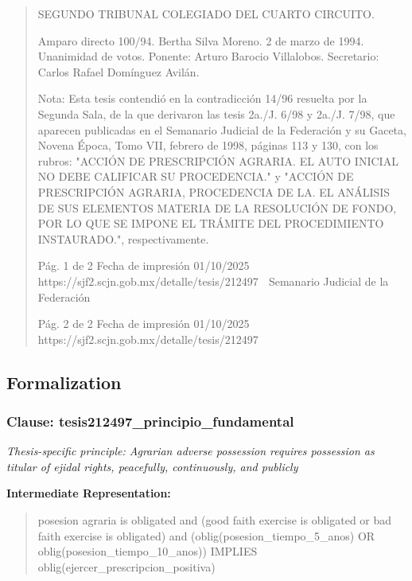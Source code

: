 \documentclass[11pt,a4paper]{article}
\begin{document}
\begin{quote}
SEGUNDO TRIBUNAL COLEGIADO DEL CUARTO CIRCUITO.


Amparo directo 100/94. Bertha Silva Moreno. 2 de marzo de 1994. Unanimidad de votos. Ponente:
Arturo Barocio Villalobos. Secretario: Carlos Rafael Domínguez Avilán.

Nota: Esta tesis contendió en la contradicción 14/96 resuelta por la Segunda Sala, de la que
derivaron las tesis 2a./J. 6/98 y 2a./J. 7/98, que aparecen publicadas en el Semanario Judicial de la
Federación y su Gaceta, Novena Época, Tomo VII, febrero de 1998, páginas 113 y 130, con los
rubros: "ACCIÓN DE PRESCRIPCIÓN AGRARIA. EL AUTO INICIAL NO DEBE CALIFICAR SU
PROCEDENCIA." y "ACCIÓN DE PRESCRIPCIÓN AGRARIA, PROCEDENCIA DE LA. EL
ANÁLISIS DE SUS ELEMENTOS MATERIA DE LA RESOLUCIÓN DE FONDO, POR LO QUE SE
IMPONE EL TRÁMITE DEL PROCEDIMIENTO INSTAURADO.", respectivamente.



                                             Pág. 1 de 2              Fecha de impresión 01/10/2025
  https://sjf2.scjn.gob.mx/detalle/tesis/212497
                                                Semanario Judicial de la Federación




                                           Pág. 2 de 2       Fecha de impresión 01/10/2025
https://sjf2.scjn.gob.mx/detalle/tesis/212497

\end{quote}

\subsection{Formalization}

\subsubsection{Clause: tesis212497\_principio\_fundamental}

\textit{Thesis-specific principle: Agrarian adverse possession requires possession as titular of ejidal rights, peacefully, continuously, and publicly}

\textbf{Intermediate Representation:}

\begin{quote}
posesion agraria is obligated and (good faith exercise is obligated or bad faith exercise is obligated) and (oblig(posesion\_tiempo\_5\_anos) OR oblig(posesion\_tiempo\_10\_anos)) IMPLIES oblig(ejercer\_prescripcion\_positiva)
\end{quote}
\end{document}
